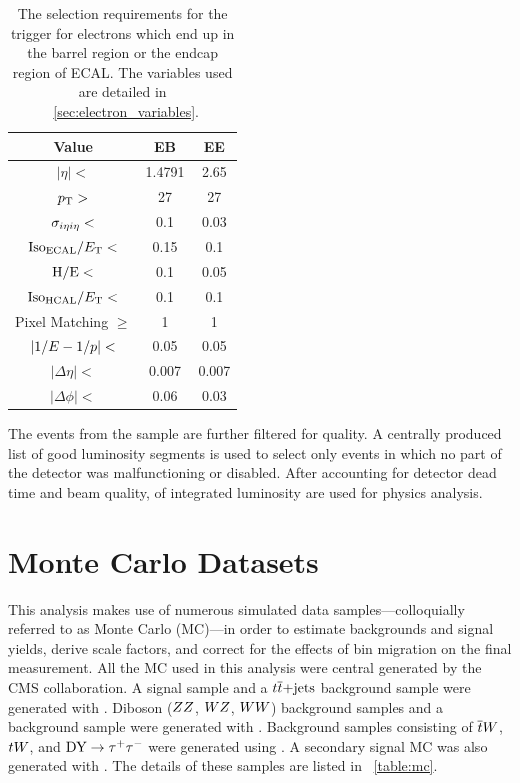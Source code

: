 \begin{table}[h]
\centering
{}
\begin{center}
    \begin{tabular}{@{}c c c@{}}
        \toprule
        Value                      & EB     & EE     \\
        \midrule
        $|\eta| <$                 & 1.4791 & 2.65   \\
        $p_{\mathrm{T}} >$                    & 27     & 27     \\
        $\sigma_{i \eta i \eta} <$         & 0.1    & 0.03   \\
        $\text{Iso}_{\text{ECAL}} / E_{\mathrm{T}} <$         & 0.15   & 0.1    \\
        $\text{H}/\text{E} <$                & 0.1    & 0.05   \\
        $\text{Iso}_{\text{HCAL}} / E_{\mathrm{T}} <$         & 0.1    & 0.1    \\
        Pixel Matching $\ge$       & 1      & 1      \\
        $|1/E - 1/p| <$              & 0.05   & 0.05   \\
        $|\Delta \eta| <$          & 0.007  & 0.007  \\
        $|\Delta \phi| <$          & 0.06   & 0.03   \\
        \bottomrule
    \end{tabular}
\end{center}
\caption{
    The selection requirements for the \SingleElectronTrigger trigger for
    electrons which end up in the barrel region or the endcap region of ECAL.
    The variables used are detailed in \SEC~\ref{sec:electron_variables}.
}
\label{table:wp80}
\end{table}

The events from the \SingleElectron sample are further filtered for quality. A
centrally produced list of good luminosity segments is used to select only
events in which no part of the detector was malfunctioning or disabled. After
accounting for detector dead time and beam quality, \GoodLumiNumber of
integrated luminosity are used for physics analysis.

\section{Monte Carlo Datasets}
\label{ssec:monte_carlo}

This analysis makes use of numerous simulated data samples---colloquially
referred to as Monte Carlo (MC)---in order to estimate backgrounds and signal
yields, derive scale factors, and correct for the effects of bin migration on
the final measurement. All the MC used in this analysis were central generated
by the CMS collaboration. A \DYtoll signal sample and a $t\overline{t}\text{+jets}$
background sample were generated with \MADGRAPH \cite{alwall2014}. Diboson
($ZZ$, $WZ$, $WW$) background samples and a \DYtotautau background sample
were generated with \PYTHIA \cite{sjostran2006}. Background samples consisting
of $\overline{t} W$, $t W$, and $\text{DY} \to \tau^{+} \tau^{-}$ were generated using \POWHEG
\cite{nason2004}\cite{alioli2010}\cite{re2011}. A secondary signal MC was also
generated with \POWHEG. The details of these samples are listed in
\TAB~\ref{table:mc}.

